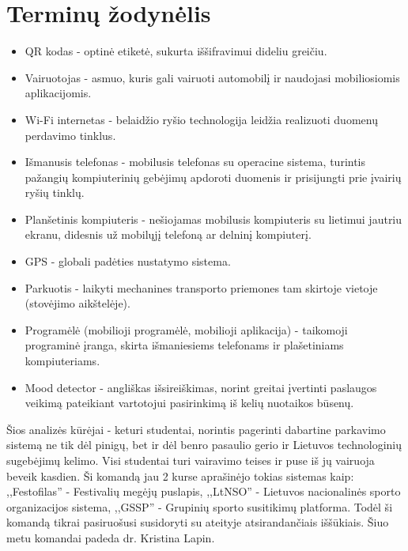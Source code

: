 \documentclass{VUMIFPSkursinis}
\begin{document}
\section{Terminų žodynėlis}
\begin{itemize}
	\item QR kodas - optinė etiketė, sukurta iššifravimui dideliu greičiu.
	\item Vairuotojas - asmuo, kuris gali vairuoti automobilį ir naudojasi mobiliosiomis aplikacijomis.
	\item Wi-Fi internetas - belaidžio ryšio technologija leidžia realizuoti duomenų perdavimo tinklus.
	\item Išmanusis telefonas - mobilusis telefonas su operacine sistema, turintis pažangių kompiuterinių gebėjimų apdoroti duomenis ir prisijungti prie įvairių ryšių tinklų.
	\item Planšetinis kompiuteris - nešiojamas mobilusis kompiuteris su lietimui jautriu ekranu, didesnis už mobilųjį telefoną ar delninį kompiuterį.
	\item GPS - globali padėties nustatymo sistema.
	\item Parkuotis - laikyti mechanines transporto priemones tam skirtoje vietoje (stovėjimo aikštelėje).
	\item Programėlė (mobilioji programėlė, mobilioji aplikacija) - taikomoji programinė įranga, skirta išmaniesiems telefonams ir plašetiniams kompiuteriams.
	\item Mood detector - angliškas išsireiškimas, norint greitai įvertinti paslaugos veikimą pateikiant vartotojui pasirinkimą iš kelių nuotaikos būsenų.
\end{itemize}


	Šios analizės kūrėjai - keturi studentai, norintis pagerinti dabartine parkavimo sistemą ne tik dėl pinigų, bet ir dėl benro pasaulio gerio ir Lietuvos technologinių sugebėjimų kelimo. Visi studentai turi vairavimo teises ir puse iš jų vairuoja beveik kasdien. Ši komandą jau 2 kurse aprašinėjo tokias sistemas kaip: ,,Festofilas'' - Festivalių megėjų puslapis, ,,LtNSO'' - Lietuvos nacionalinės sporto organizacijos sistema, ,,GSSP'' - Grupinių sporto susitikimų platforma. Todėl ši komandą tikrai pasiruošusi susidoryti su ateityje atsirandančiais iššūkiais. Šiuo metu komandai padeda dr. Kristina Lapin.
\end{document}
